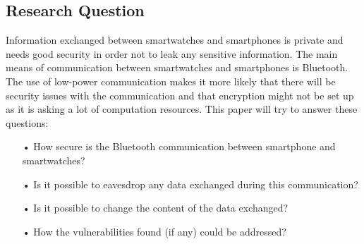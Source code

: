 \subsection{Research Question}
Information exchanged between smartwatches and smartphones is private and needs good security in order not to leak any sensitive information. 
The main means of communication between smartwatches and smartphones is Bluetooth.
The use of low-power communication makes it more likely that there will be security issues with the communication and that encryption might not be set up as it is asking a lot of computation resources. 
This paper will try to answer these questions:
\begin{itemize}
\item[•] How secure is the Bluetooth communication between smartphone and smartwatches?
\item[•]Is it possible to eavesdrop any data exchanged during this communication?
\item[•]Is it possible to change the content of the data exchanged?
\item[•]How the vulnerabilities found (if any) could be addressed?
\end{itemize}

